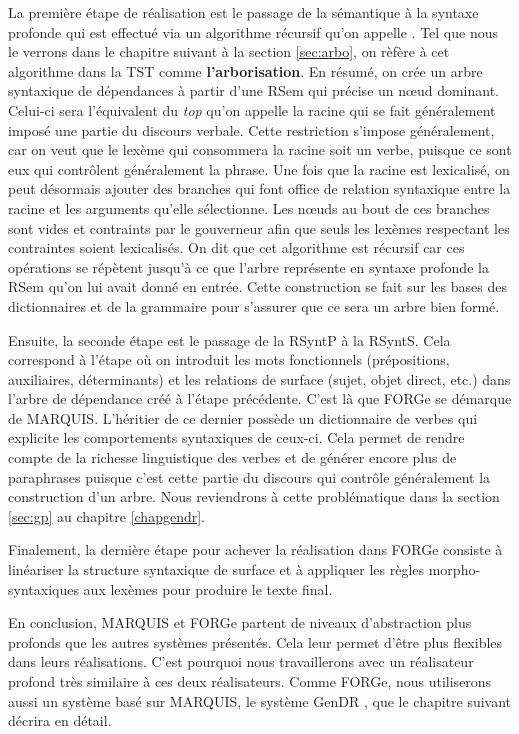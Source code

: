 La première étape de réalisation est le passage de la sémantique à la syntaxe profonde qui est effectué via un algorithme récursif qu'on appelle . Tel que nous le verrons dans le chapitre suivant à la section \ref{sec:arbo}, on rèfère à cet algorithme dans la \ac{TST} comme \textbf{l'arborisation}. En résumé, on crée un arbre syntaxique de dépendances à partir d'une \ac{RSem} qui précise un n\oe{}ud dominant. Celui-ci sera l'équivalent du \emph{top} qu'on appelle la racine qui se fait généralement imposé une partie du discours verbale. Cette restriction s'impose généralement, car on veut que le lexème qui consommera la racine soit un verbe, puisque ce sont eux qui contrôlent généralement la phrase. Une fois que la racine est lexicalisé, on peut désormais ajouter des branches qui font office de relation syntaxique entre la racine et les arguments qu'elle sélectionne. Les n\oe{}uds au bout de ces branches sont vides et contraints par le gouverneur afin que seuls les lexèmes respectant les contraintes soient lexicalisés. On dit que cet algorithme est récursif car ces opérations se répètent jusqu'à ce que l'arbre représente en syntaxe profonde la \ac{RSem} qu'on lui avait donné en entrée. Cette construction se fait sur les bases des dictionnaires et de la grammaire pour s'assurer que ce sera un arbre bien formé.

Ensuite, la seconde étape est le passage de la \ac{RSyntP} à la \ac{RSyntS}. Cela correspond à l'étape où on introduit les mots fonctionnels (prépositions, auxiliaires, déterminants) et les relations de surface (sujet, objet direct, etc.) dans l'arbre de dépendance créé à l'étape précédente. C'est là que FORGe se démarque de MARQUIS. L'héritier de ce dernier possède un dictionnaire de verbes qui explicite les comportements syntaxiques de ceux-ci. Cela permet de rendre compte de la richesse linguistique des verbes et de générer encore plus de paraphrases puisque c'est cette partie du discours qui contrôle généralement la construction d'un arbre. Nous reviendrons à cette problématique dans la section \ref{sec:gp} au chapitre \ref{chapgendr}.
                                                                                                                     
Finalement, la dernière étape pour achever la réalisation dans FORGe consiste à linéariser la structure syntaxique de surface et à appliquer les règles morpho-syntaxiques aux lexèmes pour produire le texte final.

En conclusion, MARQUIS et FORGe partent de niveaux d'abstraction plus profonds que les autres systèmes présentés. Cela leur permet d'être plus flexibles dans leurs réalisations. C'est pourquoi nous travaillerons avec un réalisateur profond très similaire à ces deux réalisateurs. Comme FORGe, nous utiliserons aussi un système basé sur MARQUIS, le système GenDR \citep{lambrey15,LambreyImplementationcollocationspour2017,lareau18}, que le chapitre suivant décrira en détail.
